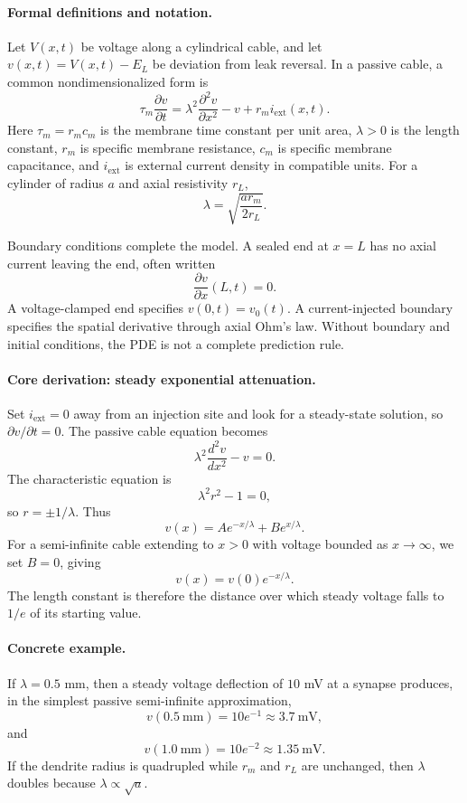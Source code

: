 \paragraph{Formal definitions and notation.}
Let \(V(x,t)\) be voltage along a cylindrical cable, and let \(v(x,t)=V(x,t)-E_L\) be deviation from leak reversal. In a passive cable, a common nondimensionalized form is
\[
\boxed{\tau_m\frac{\partial v}{\partial t}
=\lambda^2\frac{\partial^2 v}{\partial x^2}-v+r_m i_{\mathrm{ext}}(x,t).}
\]
Here \(\tau_m=r_m c_m\) is the membrane time constant per unit area, \(\lambda>0\) is the length constant, \(r_m\) is specific membrane resistance, \(c_m\) is specific membrane capacitance, and \(i_{\mathrm{ext}}\) is external current density in compatible units. For a cylinder of radius \(a\) and axial resistivity \(r_L\),
\[
\lambda=\sqrt{\frac{a r_m}{2r_L}}.
\]

Boundary conditions complete the model. A sealed end at \(x=L\) has no axial current leaving the end, often written
\[
\frac{\partial v}{\partial x}(L,t)=0.
\]
A voltage-clamped end specifies \(v(0,t)=v_0(t)\). A current-injected boundary specifies the spatial derivative through axial Ohm's law. Without boundary and initial conditions, the PDE is not a complete prediction rule.

\paragraph{Core derivation: steady exponential attenuation.}
Set \(i_{\mathrm{ext}}=0\) away from an injection site and look for a steady-state solution, so \(\partial v/\partial t=0\). The passive cable equation becomes
\[
\lambda^2\frac{d^2v}{dx^2}-v=0.
\]
The characteristic equation is
\[
\lambda^2 r^2-1=0,
\]
so \(r=\pm1/\lambda\). Thus
\[
v(x)=A e^{-x/\lambda}+B e^{x/\lambda}.
\]
For a semi-infinite cable extending to \(x>0\) with voltage bounded as \(x\to\infty\), we set \(B=0\), giving
\[
\boxed{v(x)=v(0)e^{-x/\lambda}.}
\]
The length constant is therefore the distance over which steady voltage falls to \(1/e\) of its starting value.

\paragraph{Concrete example.}
If \(\lambda=0.5\) mm, then a steady voltage deflection of \(10\) mV at a synapse produces, in the simplest passive semi-infinite approximation,
\[
v(0.5\ \mathrm{mm})=10e^{-1}\approx3.7\ \mathrm{mV},
\]
and
\[
v(1.0\ \mathrm{mm})=10e^{-2}\approx1.35\ \mathrm{mV}.
\]
If the dendrite radius is quadrupled while \(r_m\) and \(r_L\) are unchanged, then \(\lambda\) doubles because \(\lambda\propto\sqrt a\).

